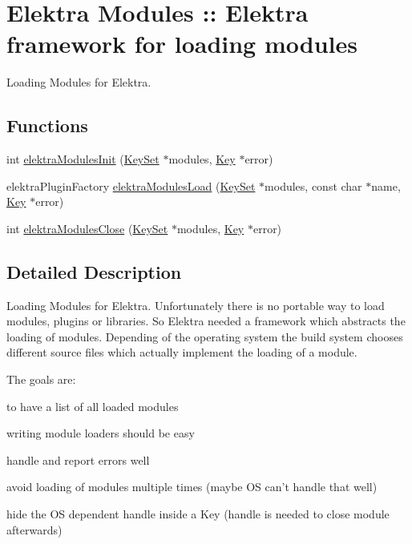 \hypertarget{group__modules}{
\section{Elektra Modules :: Elektra framework for loading modules}
\label{group__modules}
}


Loading Modules for Elektra.  


\subsection*{Functions}
\begin{DoxyCompactItemize}
\item 
int \hyperlink{group__modules_gaa40915e67f973ccd5258aa450bd03585}{elektraModulesInit} (\hyperlink{struct__KeySet}{KeySet} $\ast$modules, \hyperlink{struct__Key}{Key} $\ast$error)
\item 
elektraPluginFactory \hyperlink{group__modules_ga09300fbf0e0cfc9dc80bb877b00117c0}{elektraModulesLoad} (\hyperlink{struct__KeySet}{KeySet} $\ast$modules, const char $\ast$name, \hyperlink{struct__Key}{Key} $\ast$error)
\item 
int \hyperlink{group__modules_ga5646d92ffe3e1e04c4586d9c910ba6bd}{elektraModulesClose} (\hyperlink{struct__KeySet}{KeySet} $\ast$modules, \hyperlink{struct__Key}{Key} $\ast$error)
\end{DoxyCompactItemize}


\subsection{Detailed Description}
Loading Modules for Elektra. Unfortunately there is no portable way to load modules, plugins or libraries. So Elektra needed a framework which abstracts the loading of modules. Depending of the operating system the build system chooses different source files which actually implement the loading of a module.

The goals are:
\begin{DoxyItemize}
\item to have a list of all loaded modules
\item writing module loaders should be easy
\item handle and report errors well
\item avoid loading of modules multiple times (maybe OS can't handle that well)
\item hide the OS dependent handle inside a Key (handle is needed to close module afterwards) 
\end{DoxyItemize}

